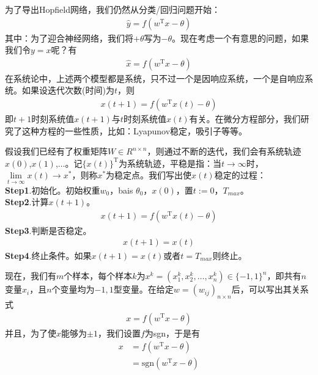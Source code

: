             \par
            为了导出Hopfield网络，我们仍然从分类/回归问题开始：
            \begin{align*}
            \hat{y} = f(w^\mathrm{T}x-\theta)
            \end{align*}
            其中：为了迎合神经网络，我们将$+\theta$写为$-\theta$。现在考虑一个有意思的问题，如果我们令$y=x$呢？有
            \begin{align*}
            \hat{x} = f(w^\mathrm{T}x-\theta)
            \end{align*}
            在系统论中，上述两个模型都是系统，只不过一个是因响应系统，一个是自响应系统。如果设迭代次数(时间)为$t$，则
            \begin{align*}
            x(t+1) = f(w^\mathrm{T}x(t)-\theta)
            \end{align*}
            即$t+1$时刻系统值$x(t+1)$与$t$时刻系统值$x(t)$有关。在微分方程部分，我们研究了这种方程的一些性质，比如：Lyapunov稳定，吸引子等等。
            \par
            假设我们已经有了权重矩阵$W\in R^{n\times n}$，则通过不断的迭代，我们会有系统轨迹$x(0)$,$x(1)$,$\dots$。记$\{x(t)\}^\mathrm{T}$为系统轨迹，平稳是指：当$t\rightarrow \infty$时，$\lim\limits_{t\rightarrow \infty} x(t)\rightarrow x^*$，则称$x^*$为稳定点。我们写出使$x(t)$稳定的过程：\\
            \textbf{Step1}.初始化。初始权重$w_0$，bais $\theta_0$，$x(0)$，置$t:=0$，$T_{max}$。\\
            \textbf{Step2}.计算$x(t+1)$。
            \begin{align*}
            x(t+1) = f(w^\mathrm{T}x(t)-\theta)
            \end{align*}
            \textbf{Step3}.判断是否稳定。
            \begin{align*}
            x(t+1) = x(t)
            \end{align*}
            \textbf{Step4}.终止条件。如果$x(t+1) = x(t)$或者$t = T_{max}$则终止。
            \par
            现在，我们有$m$个样本，每个样本$k$为$x^k = (x_1^k,x_2^k,\dots,x_n^k)\in \{-1,1\}^n$，即共有$n$变量$x_i$，且$n$个变量均为$-1,1$型变量。在给定$w = (w_{ij})_{n\times n}$后，可以写出其关系式
            \begin{align*}
            x = f(w^\mathrm{T}x - \theta)
            \end{align*}
            并且，为了使$x$能够为$\pm 1$，我们设置$f$为sgn，于是有
            \begin{align*}
            x & = f(w^\mathrm{T}x - \theta)\\
            & = \mathrm{sgn}(w^\mathrm{T}x - \theta)
            \end{align*}
